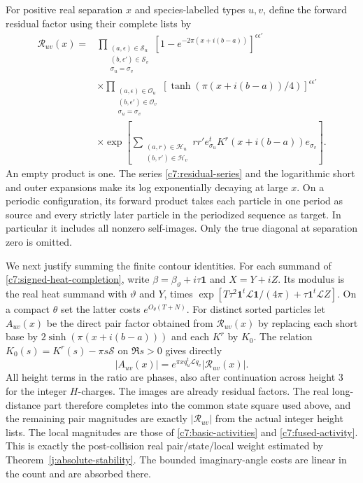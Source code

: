 For positive real separation $x$ and species-labelled types $u,v$, define
the forward residual factor using their complete lists by
\begin{equation}\label{c7:forward-residual}
\begin{split}
\mathscr R_{uv}(x)={}&
\prod_{\substack{(a,\epsilon)\in\mathscr S_u\\
                 (b,\epsilon')\in\mathscr S_v\\
                 \sigma_u=\sigma_v}}
 [1-e^{-2\pi(x+i(b-a))}]^{\epsilon\epsilon'}\\
&\times
\prod_{\substack{(a,\epsilon)\in\mathscr O_u\\
                 (b,\epsilon')\in\mathscr O_v\\
                 \sigma_u=\sigma_v}}
 [\tanh(\pi(x+i(b-a))/4)]^{\epsilon\epsilon'}\\
&\times\exp\!\left[
\sum_{\substack{(a,r)\in\mathscr H_u\\(b,r')\in\mathscr H_v}}
 rr'e_{\sigma_u}^tK^r(x+i(b-a))e_{\sigma_v}\right].
\end{split}
\end{equation}
An empty product is one.  The series \eqref{c7:residual-series} and the
logarithmic short and outer expansions make its log exponentially decaying
at large $x$.  On a periodic configuration, its forward product takes each
particle in one period as source and every strictly later particle in the
periodized sequence as target.  In particular it includes all nonzero
self-images.  Only the true diagonal at separation zero is omitted.

We next justify summing the finite contour identities.  For each summand of
\eqref{c7:signed-heat-completion}, write $\beta=\beta_\vartheta+i\tau\mathbf1$
and $X=Y+iZ$.  Its modulus is the real heat summand with $\vartheta$ and $Y$,
times
$\exp[T\tau^2\mathbf1^t\mathcal L\mathbf1/(4\pi)+\tau\mathbf1^t\mathcal L Z]$.
On a compact $\theta$ set the latter costs $e^{O_\theta(T+N)}$.
For distinct sorted particles let $A_{uv}(x)$ be the direct pair factor
obtained from $\mathscr R_{uv}(x)$ by replacing each short base by
$2\sinh(\pi(x+i(b-a)))$ and each $K^r$ by $K_0$.  The relation
$K_0(s)=K^r(s)-\pi s\mathcal S$ on $\Re s>0$ gives directly
\[
|A_{uv}(x)|=e^{\pi xq_u^t\mathcal Lq_v}|\mathscr R_{uv}(x)|.
\]
All height terms in the ratio are phases, also after continuation across
height $3$ for the integer $H$-charges.  The images are already residual
factors.  The real long-distance part therefore completes into the common
state square used above, and the remaining pair magnitudes are exactly
$|\mathscr R_{uv}|$ from the actual integer height lists.  The local magnitudes are those of
\eqref{c7:basic-activities} and \eqref{c7:fused-activity}.  This is exactly
the post-collision real pair/state/local weight estimated by
Theorem~\ref{j:absolute-stability}.  The bounded imaginary-angle costs are
linear in the count and are absorbed there.

